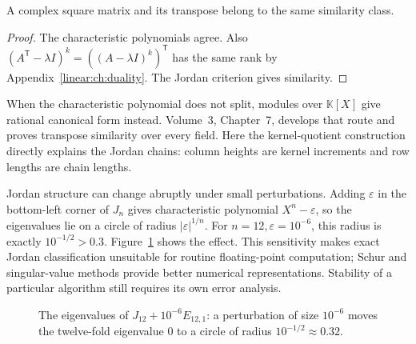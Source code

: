 \begin{corollary}\label{linear:cor:transpose}
A complex square matrix and its transpose belong to the same similarity class.
\end{corollary}
\begin{proof}
The characteristic polynomials agree. Also $(A^{\mathsf T}-\lambda I)^k=((A-\lambda I)^k)^{\mathsf T}$ has the same rank by Appendix~\ref{linear:ch:duality}. The Jordan criterion gives similarity.
\end{proof}

\begin{remark}
When the characteristic polynomial does not split, modules over $\mathbb K[X]$ give rational canonical form instead. Volume~3, Chapter~7, develops that route and proves transpose similarity over every field. Here the kernel-quotient construction directly explains the Jordan chains: column heights are kernel increments and row lengths are chain lengths.
\end{remark}

Jordan structure can change abruptly under small perturbations. Adding $\varepsilon$ in the bottom-left corner of $J_n$ gives characteristic polynomial $X^n-\varepsilon$, so the eigenvalues lie on a circle of radius $|\varepsilon|^{1/n}$. For $n=12,\varepsilon=10^{-6}$, this radius is exactly $10^{-1/2}>0.3$. Figure~\ref{linear:fig:perturb} shows the effect. This sensitivity makes exact Jordan classification unsuitable for routine floating-point computation; Schur and singular-value methods provide better numerical representations. Stability of a particular algorithm still requires its own error analysis.
\begin{figure}[ht]
\centering
{}
\caption{The eigenvalues of $J_{12}+10^{-6}E_{12,1}$: a perturbation of size $10^{-6}$ moves the twelve-fold eigenvalue $0$
to a circle of radius $10^{-1/2}\approx0.32$.}
\label{linear:fig:perturb}
\end{figure}

